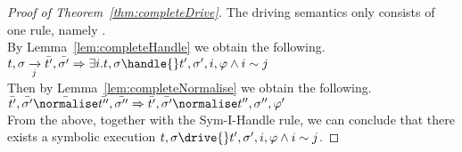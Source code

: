 \begin{proof}[Proof of Theorem~\ref{thm:completeDrive}]
  The driving semantics only consists of one rule, namely .\\
  By Lemma~\ref{lem:completeHandle} we obtain the following.\\
  $t,\sigma\xrightarrow[j]{}\bar{t'},\bar{\sigma'}\implies \exists i . t,\sigma\handle{}t',\sigma',i,\phi \land i\sim j$\\
  Then by Lemma~\ref{lem:completeNormalise} we obtain the following.\\
  $\bar{t'},\bar{\sigma'}\bar{\normalise}\bar{t''},\bar{\sigma''}\implies \bar{t'},\bar{\sigma'}\normalise t'',\sigma'',\phi'$\\
  From the above, together with the Sym-I-Handle rule, we can conclude that there exists a symbolic execution $t,\sigma\drive{} t',\sigma',i,\phi\land i\sim j$.

\end{proof}
